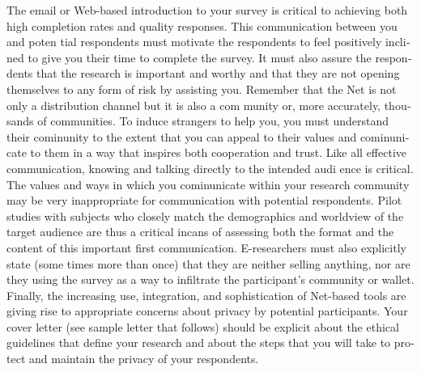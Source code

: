 \documentclass[a4 paper,12pt]{article}\usepackage{xepersian}
\begin{document}
\begin{latin}
\noindent
The email or Web-based introduction to your survey is critical to achieving both high completion rates and quality responses. This communication between you and poten tial respondents must motivate the respondents to feel positively inclined to give you their time to complete the survey. It must also assure the respondents that the research is important and worthy and that they are not opening themselves to any form of risk by assisting you. 
Remember that the Net is not only a distribution channel but it is also a com munity or, more accurately, thousands of communities. To induce strangers to help you, you must understand their cominunity to the extent that you can appeal to their values and cominunicate to them in a way that inspires both cooperation and trust. Like all effective communication, knowing and talking directly to the intended audi ence is critical. The values and ways in which you cominunicate within your research community may be very inappropriate for communication with potential respondents. Pilot studies with subjects who closely match the demographics and worldview of the target audience are thus a critical incans of assessing both the format and the content of this important first communication. E-researchers must also explicitly state (some times more than once) that they are neither selling anything, nor are they using the survey as a way to infiltrate the participant's community or wallet. 
Finally, the increasing use, integration, and sophistication of Net-based tools are giving rise to appropriate concerns about privacy by potential participants. Your cover letter (see sample letter that follows) should be explicit about the ethical guidelines that define your research and about the steps that you will take to protect and maintain the privacy of your respondents. 

\vspace{0.1cm}




\end{latin}
\noindent
\end{document}
